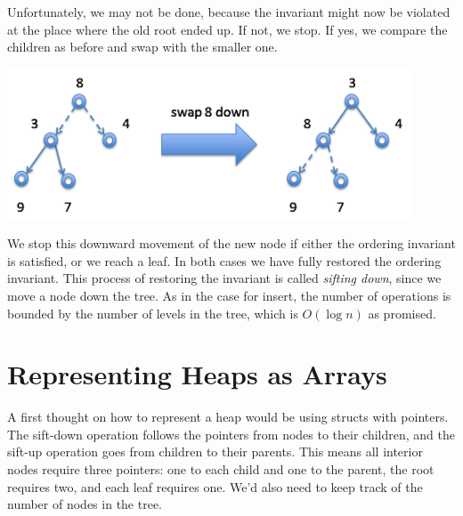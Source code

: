 Unfortunately, we may not be done, because the invariant might now
be violated at the place where the old root ended up.  If not, we stop.
If yes, we compare the children as before and swap with the smaller
one.
\begin{center}
  \includegraphics[width=0.9\textwidth]{img/swap8down-a.png}
\end{center}

We stop this downward movement of the new node if either the ordering
invariant is satisfied, or we reach a leaf.  In both cases we have fully
restored the ordering invariant.  This process of restoring the invariant is
called \emph{sifting down}, since we move a node down the tree.  As in the
case for insert, the number of operations is bounded by the number of levels
in the tree, which is $O(\log n)$ as promised.

\section{Representing Heaps as Arrays}
\label{sec:heap_impl}

A first thought on how to represent a heap would be using structs with
pointers.  The sift-down operation follows the pointers from nodes to their
children, and the sift-up operation goes from children to their parents.  This
means all interior nodes require three pointers: one to each child and one to
the parent, the root requires two, and each leaf requires one. We'd also need
to keep track of the number of nodes in the tree.

